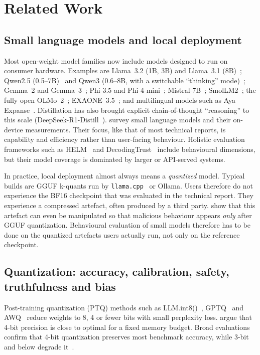 \section{Related Work}
\label{sec:related}

\subsection{Small language models and local deployment}
Most open-weight model families now include models designed to run on consumer
hardware. Examples are Llama~3.2 (1B, 3B) and Llama~3.1 (8B)~\citep{grattafiori2024llama3};
Qwen2.5 (0.5--7B)~\citep{qwen2025qwen25} and Qwen3 (0.6--8B, with a switchable
``thinking'' mode)~\citep{yang2025qwen3}; Gemma~2 and Gemma~3~\citep{gemmateam2024gemma2,gemmateam2025gemma3};
Phi-3.5 and Phi-4-mini~\citep{abdin2024phi3,microsoft2025phi4mini};
Mistral-7B~\citep{jiang2023mistral}; SmolLM2~\citep{allal2025smollm2};
the fully open OLMo~2~\citep{olmo2024olmo2}; EXAONE~3.5~\citep{lgai2024exaone35};
and multilingual models such as Aya Expanse~\citep{dang2024ayaexpanse}.
Distillation has also brought explicit chain-of-thought ``reasoning'' to this scale
(DeepSeek-R1-Distill~\citep{deepseekai2025r1}). \citet{lu2024slm} survey small
language models and their on-device measurements. Their focus, like that of most
technical reports, is capability and efficiency rather than user-facing behaviour.
Holistic evaluation frameworks such as HELM~\citep{liang2023helm} and
DecodingTrust~\citep{wang2023decodingtrust} include behavioural dimensions, but
their model coverage is dominated by larger or API-served systems.

In practice, local deployment almost always means a \emph{quantized} model.
Typical builds are GGUF k-quants run by \texttt{llama.cpp}~\citep{gerganov2023llamacpp}
or Ollama. Users therefore do not experience the BF16 checkpoint that was
evaluated in the technical report. They experience a compressed artefact, often
produced by a third party. \citet{egashira2025mindgap} show that this artefact can
even be manipulated so that malicious behaviour appears \emph{only} after GGUF
quantization. Behavioural evaluation of small models therefore has to be done on the
quantized artefacts users actually run, not only on the reference checkpoint.

\subsection{Quantization: accuracy, calibration, safety, truthfulness and bias}
Post-training quantization (PTQ) methods such as LLM.int8()~\citep{dettmers2022llmint8},
GPTQ~\citep{frantar2023gptq} and AWQ~\citep{lin2024awq} reduce weights to 8, 4 or
fewer bits with small perplexity loss. \citet{dettmers2023case} argue that 4-bit
precision is close to optimal for a fixed memory budget. Broad evaluations confirm
that 4-bit quantization preserves most benchmark accuracy, while 3-bit and below
degrade it~\citep{jin2024comprehensive}.

